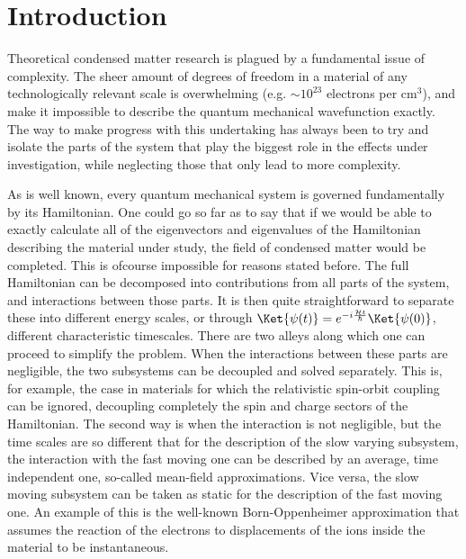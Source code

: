 \chapter{Introduction}
Theoretical condensed matter research is plagued by a fundamental issue of complexity. The sheer amount of degrees of freedom in a material of any technologically relevant scale is overwhelming (e.g. $\sim10^{23}$ electrons per cm$^3$), and make it impossible to describe the quantum mechanical wavefunction exactly.
The way to make progress with this undertaking has always been to try and isolate the parts of the system that play the biggest role in the effects under investigation, while neglecting those that only lead to more complexity.

As is well known, every quantum mechanical system is governed fundamentally by its Hamiltonian. One could go so far as to say that if we would be able to exactly calculate all of the eigenvectors and eigenvalues of the Hamiltonian describing the material under study, the field of condensed matter would be completed. This is ofcourse impossible for reasons stated before.
The full Hamiltonian can be decomposed into contributions from all parts of the system, and interactions between those parts.
It is then quite straightforward to separate these into different energy scales, or through $\Ket{\psi(t)} = e^{-i \frac{\mathcal{H}t}{\hbar}}\Ket{\psi(0)}$, different characteristic timescales.
There are two alleys along which one can proceed to simplify the problem. When the interactions between these parts are negligible, the two subsystems can be decoupled and solved separately.
This is, for example, the case in materials for which the relativistic spin-orbit coupling can be ignored, decoupling completely the spin and charge sectors of the Hamiltonian.
The second way is when the interaction is not negligible, but the time scales are so different that for the description of the slow varying subsystem, the interaction with the fast moving one can be described by an average, time independent one, so-called mean-field approximations.
Vice versa, the slow moving subsystem can be taken as static for the description of the fast moving one.
An example of this is the well-known Born-Oppenheimer approximation that assumes the reaction of the electrons to displacements of the ions inside the material to be instantaneous.


